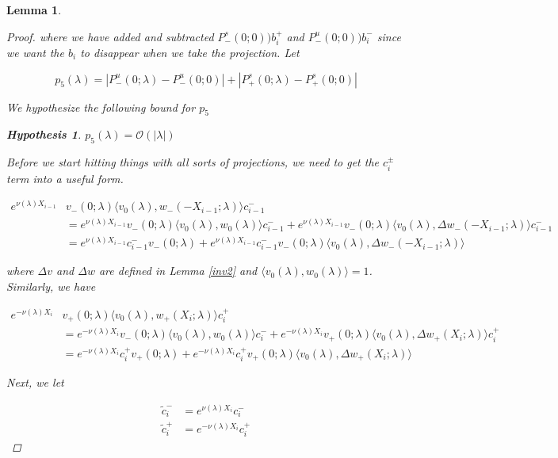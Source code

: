 \documentclass[12pt]{article}
\newtheorem{lemma}{Lemma}
\newtheorem{hypothesis}{Hypothesis}
\begin{document}
\begin{lemma}
\begin{proof}
where we have added and subtracted $P^s_-(0; 0))b_i^+$ and $P^u_-(0; 0))b_i^-$ since we want the $b_i$ to disappear when we take the projection. Let

\begin{equation}\label{p5}
p_5(\lambda) = |P^u_-(0;\lambda) - P^u_-(0; 0)| + |P^s_+(0;\lambda) - P^s_+(0;0)|
\end{equation}

We hypothesize the following bound for $p_5$

\begin{hypothesis}
$p_5(\lambda) = \mathcal{O}(|\lambda|)$
\end{hypothesis}

Before we start hitting things with all sorts of projections, we need to get the $c_i^\pm$ term into a useful form.

\begin{align*}
e^{\nu(\lambda)X_{i-1}} &v_-(0; \lambda) \langle v_0(\lambda), w_-(-X_{i-1}; \lambda) \rangle c_{i-1}^- \\
&= e^{\nu(\lambda)X_{i-1}} v_-(0; \lambda) \langle v_0(\lambda), w_0(\lambda) \rangle c_{i-1}^- + e^{\nu(\lambda)X_{i-1}} v_-(0; \lambda) \langle v_0(\lambda), \Delta w_-(-X_{i-1}; \lambda) \rangle c_{i-1}^- \\
&= e^{\nu(\lambda)X_{i-1}} c_{i-1}^- v_-(0; \lambda) + e^{\nu(\lambda)X_{i-1}} c_{i-1}^- v_-(0; \lambda) \langle v_0(\lambda), \Delta w_-(-X_{i-1}; \lambda) \rangle 
\end{align*}

where $\Delta v$ and $\Delta w$ are defined in Lemma \ref{inv2} and $\langle v_0(\lambda), w_0(\lambda) \rangle = 1$. Similarly, we have

\begin{align*}
e^{-\nu(\lambda)X_i} &v_+(0; \lambda) \langle v_0(\lambda), w_+(X_i; \lambda) \rangle c_i^+ \\
&= e^{-\nu(\lambda)X_i} v_-(0; \lambda) \langle v_0(\lambda), w_0(\lambda) \rangle c_i^- + e^{-\nu(\lambda)X_i} v_+(0; \lambda) \langle v_0(\lambda), \Delta w_+(X_i; \lambda) \rangle c_i^+ \\
&= e^{-\nu(\lambda)X_i} c_i^+ v_+(0; \lambda) + e^{-\nu(\lambda)X_i} c_i^+ v_+(0; \lambda) \langle v_0(\lambda), \Delta w_+(X_i; \lambda) \rangle 
\end{align*}

Next, we let

\begin{align*}
\tilde{c}_i^- &= e^{\nu(\lambda)X_i} c_i^- \\
\tilde{c}_i^+ &= e^{-\nu(\lambda)X_i} c_i^+
\end{align*}


\end{proof}
\end{lemma}
\end{document}
